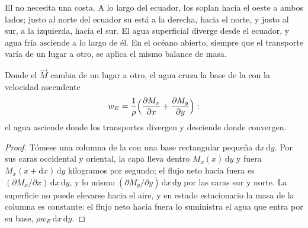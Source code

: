 El  no necesita una costa. A lo largo del ecuador, los  soplan hacia el oeste a ambos lados; justo al norte del ecuador su  está a la derecha, hacia el norte, y justo al sur, a la izquierda, hacia el sur. El agua superficial diverge desde el ecuador, y agua fría asciende a lo largo de él. En el océano abierto, siempre que el transporte varía de un lugar a otro, se aplica el mismo balance de masa.

\begin{proposition}\label{prop:b1:ocean-circulation:pumping}
Donde el  $\vec M$ cambia de un lugar a otro, el agua cruza la base de la  con la velocidad ascendente
\[
  w_E = \frac{1}{\rho}\Bigl(\frac{\partial M_x}{\partial x} + \frac{\partial M_y}{\partial y}\Bigr):
\]
el agua asciende donde los transportes divergen y desciende donde convergen.
\end{proposition}

\begin{proof}
Tómese una columna de la  con una base rectangular pequeña $\mathrm dx\,\mathrm
dy$. Por sus caras occidental y oriental, la capa lleva dentro $M_x(x)\,\mathrm dy$ y fuera $M_x(x + \mathrm dx)\,\mathrm dy$ kilogramos por segundo; el flujo neto hacia fuera es $(\partial M_x/\partial x)\,\mathrm dx\,\mathrm dy$, y lo mismo $(\partial M_y/\partial y)\,\mathrm dx\,\mathrm dy$ por las caras sur y norte. La superficie no puede elevarse hacia el aire, y en estado estacionario la masa de la columna es constante: el flujo neto hacia fuera lo suministra el agua que entra por su base, $\rho w_E\,\mathrm dx\,\mathrm dy$.
\end{proof}


